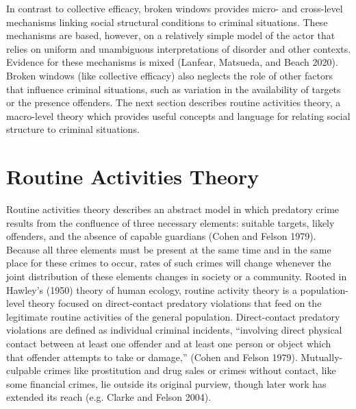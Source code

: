 \documentclass [11pt, proquest] {uwthesis}[2015/03/03]
\begin{document}
In contrast to collective efficacy, broken windows provides micro- and cross-level mechanisms linking social structural conditions to criminal situations. These mechanisms are based, however, on a relatively simple model of the actor that relies on uniform and unambiguous interpretations of disorder and other contexts. Evidence for these mechanisms is mixed (Lanfear, Matsueda, and Beach 2020). Broken windows (like collective efficacy) also neglects the role of other factors that influence criminal situations, such as variation in the availability of targets or the presence offenders. The next section describes routine activities theory, a macro-level theory which provides useful concepts and language for relating social structure to criminal situations.

\hypertarget{routine-activities-theory}{%
\section{Routine Activities Theory}\label{routine-activities-theory}}

Routine activities theory describes an abstract model in which predatory crime results from the confluence of three necessary elements: suitable targets, likely offenders, and the absence of capable guardians (Cohen and Felson 1979). Because all three elements must be present at the same time and in the same place for these crimes to occur, rates of such crimes will change whenever the joint distribution of these elements changes in society or a community. Rooted in Hawley's (1950) theory of human ecology, routine activity theory is a population-level theory focused on direct-contact predatory violations that feed on the legitimate routine activities of the general population. Direct-contact predatory violations are defined as individual criminal incidents, ``involving direct physical contact between at least one offender and at least one person or object which that offender attempts to take or damage,'' (Cohen and Felson 1979). Mutually-culpable crimes like prostitution and drug sales or crimes without contact, like some financial crimes, lie outside its original purview, though later work has extended its reach (e.g. Clarke and Felson 2004).
\end{document}
